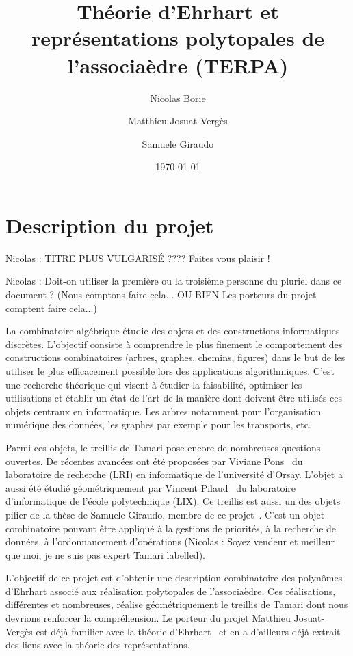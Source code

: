 \documentclass[a4paper, 10pt]{article}
\title{Théorie d'Ehrhart et représentations polytopales de
l'associaèdre (TERPA)}
\date{\today}
\author{Nicolas Borie \and Matthieu Josuat-Verg\`es \and Samuele Giraudo}
\numberwithin{equation}{subsection}
\begin{document}
\maketitle

\section{Description du projet}

Nicolas : TITRE PLUS VULGARISÉ ???? Faites vous plaisir !

Nicolas : Doit-on utiliser la première ou la troisième personne du pluriel dans ce document ?
(Nous comptons faire cela... OU BIEN Les porteurs du projet comptent faire cela...)


La combinatoire algébrique étudie des objets et des constructions
informatiques discrètes. L'objectif consiste à comprendre le plus
finement le comportement des constructions combinatoires (arbres,
graphes, chemins, figures) dans le but de les utiliser le plus
efficacement possible lors des applications algorithmiques. C'est une
recherche théorique qui visent à étudier la faisabilité, optimiser les
utilisations et établir un état de l'art de la manière dont doivent
être utilisés ces objets centraux en informatique. Les arbres
notamment pour l'organisation numérique des données, les graphes par
exemple pour les transports, etc.



Parmi ces objets, le treillis de Tamari pose encore de nombreuses
questions ouvertes. De récentes avancées ont été proposées par Viviane
Pons~\cite{MR3345297} du laboratoire de recherche (LRI) en
informatique de l'université d'Orsay. L'objet a aussi été étudié
géométriquement par Vincent Pilaud~\cite{MR3327085} du laboratoire
d'informatique de l'école polytechnique (LIX). Ce treillis est aussi
un des objets pilier de la thèse de Samuele Giraudo, membre de ce
projet~\cite{MR2887627}. C'est un objet combinatoire pouvant être
appliqué à la gestions de priorités, à la recherche de données, à
l'ordonnancement d'opérations (Nicolas : Soyez vendeur et meilleur que
moi, je ne suis pas expert Tamari labelled).



L'objectif de ce projet est d'obtenir une description combinatoire des
polynômes d'Ehrhart associé aux réalisation polytopales de
l'associaèdre. Ces réalisations, différentes et nombreuses, réalise
géométriquement le treillis de Tamari dont nous devrions renforcer la
compréhension. Le porteur du projet Matthieu Josuat-Vergès est déjà
familier avec la théorie d'Ehrhart~\cite{MR3484760} et en a d'ailleurs
déjà extrait des liens avec la théorie des représentations.
\end{document}
